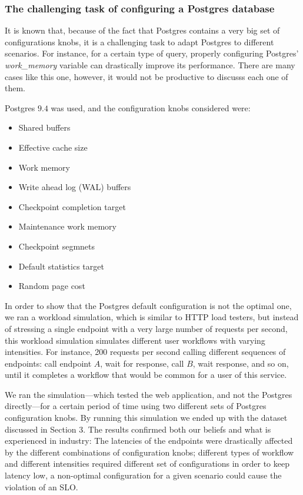 \subsubsection{The challenging task of configuring a Postgres database}

It is known that, because of the fact that Postgres contains a very big set of configurations knobs, it is a challenging task to adapt Postgres to different scenarios. For instance, for a certain type of query, properly configuring Postgres' \textit{work\_memory} variable can drastically improve its performance. There are many cases like this one, however, it would not be productive to discusss each one of them.

Postgres $9.4$ was used, and the configuration knobs considered were:

\begin{itemize}
  \item Shared buffers
  \item Effective cache size
  \item Work memory
  \item Write ahead log (WAL) buffers
  \item Checkpoint completion target
  \item Maintenance work memory
  \item Checkpoint segmnets
  \item Default statistics target
  \item Random page cost
\end{itemize}

In order to show that the Postgres default configuration is not the optimal one, we ran a workload simulation, which is similar to HTTP load testers, but instead of stressing a single endpoint with a very large number of requests per second, this workload simulation simulates different user workflows with varying intensities. For instance, 200 requests per second calling different sequences of endpoints: call endpoint $A$, wait for response, call $B$, wait response, and so on, until it completes a workflow that would be common for a user of this service. 

We ran the simulation---which tested the web application, and not the Postgres directly---for a certain period of time using two different sets of Postgres configuration knobs. By running this simulation we ended up with the dataset discussed in Section 3. The results confirmed both our beliefs and what is experienced in industry: The latencies of the endpoints were drastically affected by the different combinations of configuration knobs; different types of workflow and different intensities required different set of configurations in order to keep latency low, a non-optimal configuration for a given scenario could cause the violation of an SLO.

